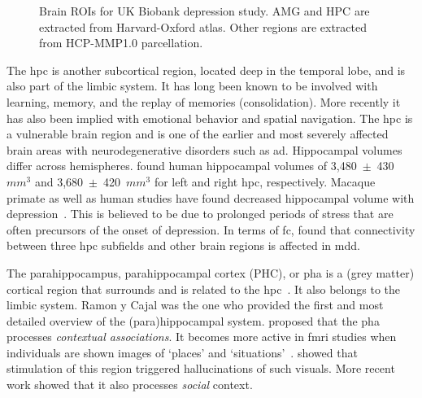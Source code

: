\begin{figure}[t]
  \hspace{0.08\textwidth}
  \caption{
    Brain ROIs for UK Biobank depression study.
    AMG and HPC are extracted from Harvard-Oxford atlas.
    Other regions are extracted from HCP-MMP1.0 parcellation.
  }\label{fig:ukb-brain-regions}
\end{figure}


The \gls{hpc} is another subcortical region, located deep in the temporal lobe, and is also part of the limbic system.
It has long been known to be involved with learning, memory, and the replay of memories (consolidation).
More recently it has also been implied with emotional behavior and spatial navigation.
The \gls{hpc} is a vulnerable brain region and is one of the earlier and most severely affected brain areas with neurodegenerative disorders such as \gls{ad}.
Hippocampal volumes differ across hemispheres.
\textcite{McHugh2007} found human hippocampal volumes of 3,480~$\pm$~430~$mm^3$ and 3,680~$\pm$~420~$mm^3$ for left and right \gls{hpc}, respectively.
Macaque primate as well as human studies have found decreased hippocampal volume with depression~\parencite{Campbell2004, Malykhin2010, Brown2014, Schmaal2016}.
This is believed to be due to prolonged periods of stress that are often precursors of the onset of depression.
In terms of \gls{fc}, \textcite{Hao2020} found that connectivity between three \gls{hpc} subfields and other brain regions is affected in \gls{mdd}.

The parahippocampus, parahippocampal cortex (PHC), or \gls{pha} is a (grey matter) cortical region that surrounds and is related to the \gls{hpc}~\parencite{Burwell2000}.
It also belongs to the limbic system.
Ramon y Cajal was the one who provided the first and most detailed overview of the (para)hippocampal system.
\textcite{Aminoff2013} proposed that the \gls{pha} processes \emph{contextual associations}.
It becomes more active in \gls{fmri} studies when individuals are shown images of `places' and `situations'~\parencite{Epstein1998}.
\textcite{Megevand2014} showed that stimulation of this region triggered hallucinations of such visuals.
More recent work showed that it also processes \emph{social} context.

